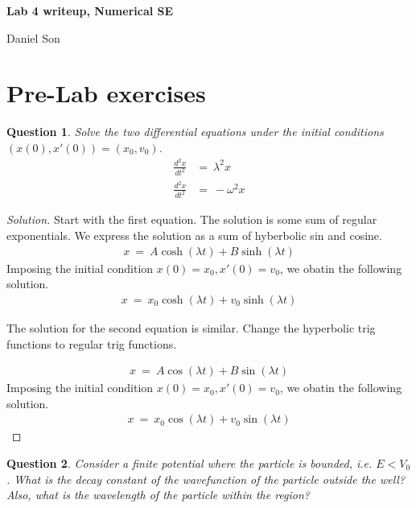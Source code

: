 \documentclass{article}
\numberwithin{equation}{section}
\newcommand{\dderiv}[2]{
\frac {d^2 {#1} } {d{#2}^2}
}
\newtheorem{question}{Question}[section]
\begin{document}
\begin{center}
    \Large
    \textbf{Lab 4 writeup, Numerical SE}

    \large
    Daniel Son
\end{center}

\section{Pre-Lab exercises}

\begin{question}
Solve the two differential equations under 
the initial conditions $(x(0), x'(0)) = (x_0, v_0)$. 
\begin{align}\label{eqn:diffeqs}
    \dderiv{x}{t} & = \ \lambda^2 x \\ 
    \dderiv{x}{t} & = \ -\omega^2 x 
\end{align}
\end{question}

\begin{proof}[Solution]
    Start with the first equation. The solution is some sum 
    of regular exponentials. We express the solution 
    as a sum of hyberbolic sin and cosine. 
    \begin{align}
        x \ = \ A \cosh(\lambda t) + B \sinh(\lambda t)
    \end{align}
    Imposing the initial condition $x(0) = x_0, x'(0) = v_0$, we 
    obatin the following solution. 
    \begin{align}
        x \ = \ x_0 \cosh(\lambda t) + v_0 \sinh(\lambda t)
    \end{align}

    The solution for the second equation is similar. Change the 
    hyperbolic trig functions to regular trig functions. 

\begin{align}
        x \ = \ A \cos(\lambda t) + B \sin(\lambda t)
    \end{align}
    Imposing the initial condition $x(0) = x_0, x'(0) = v_0$, we 
    obatin the following solution. 
    \begin{align}
        x \ = \ x_0 \cos(\lambda t) + v_0 \sin(\lambda t)
    \end{align}
\end{proof}

\begin{question}
    Consider a finite potential where the particle is 
    bounded, i.e. $E < V_0$. What is the decay constant 
    of the wavefunction of the particle outside the well? 
    Also, what is the wavelength of the particle within the 
    region?
\end{question}
\end{document}
